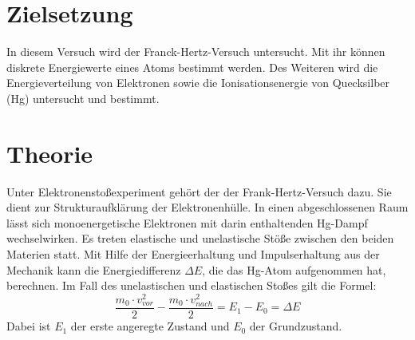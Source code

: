 \section{Zielsetzung}
In diesem Versuch wird der Franck-Hertz-Versuch untersucht.
Mit ihr können diskrete Energiewerte eines Atoms bestimmt werden. Des Weiteren wird
die Energieverteilung von Elektronen sowie die Ionisationsenergie von Quecksilber (Hg) untersucht und bestimmt.
\section{Theorie}
Unter Elektronenstoßexperiment gehört der der Frank-Hertz-Versuch dazu. Sie dient zur Strukturaufklärung
der Elektronenhülle.
In einen abgeschlossenen Raum lässt sich monoenergetische Elektronen mit darin enthaltenden Hg-Dampf wechselwirken.
Es treten elastische und unelastische Stöße zwischen den beiden Materien statt.
Mit Hilfe der Energieerhaltung und Impulserhaltung aus der Mechanik kann die Energiedifferenz $\Delta E$,
die das Hg-Atom aufgenommen hat, berechnen.
Im Fall des unelastischen und elastischen Stoßes gilt die Formel:
\begin{equation}
  \frac{m_0 \cdot v_{vor}^2}{2} - \frac{m_0 \cdot v_{nach}^2}{2} = E_1 - E_0 = \Delta E
\label{eq:1}
\end{equation}
Dabei ist $E_1$ der erste angeregte Zustand und $E_0$ der Grundzustand.
